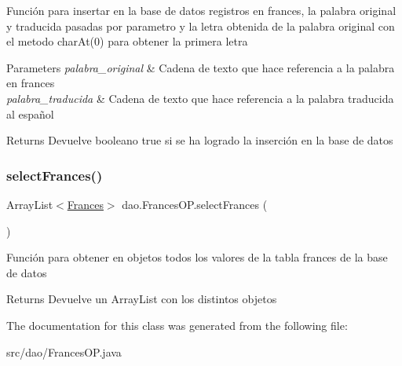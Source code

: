 Función para insertar en la base de datos registros en frances, la palabra original y traducida pasadas por parametro y la letra obtenida de la palabra original con el metodo char\+At(0) para obtener la primera letra 
\begin{DoxyParams}{Parameters}
{\em palabra\+\_\+original} & Cadena de texto que hace referencia a la palabra en frances \\
\hline
{\em palabra\+\_\+traducida} & Cadena de texto que hace referencia a la palabra traducida al español \\
\hline
\end{DoxyParams}
\begin{DoxyReturn}{Returns}
Devuelve booleano true si se ha logrado la inserción en la base de datos 
\end{DoxyReturn}
\mbox{\label{classdao_1_1_frances_o_p_a0a5b0c845f18105eaff2474c35d75720}} 
\subsubsection{\texorpdfstring{selectFrances()}{selectFrances()}}
{\footnotesize\ttfamily Array\+List$<$\mbox{\hyperlink{classvo_1_1_frances}{Frances}}$>$ dao.\+Frances\+O\+P.\+select\+Frances (\begin{DoxyParamCaption}{ }\end{DoxyParamCaption})\hspace{0.3cm}{\ttfamily [inline]}}

Función para obtener en objetos todos los valores de la tabla frances de la base de datos \begin{DoxyReturn}{Returns}
Devuelve un Array\+List con los distintos objetos 
\end{DoxyReturn}


The documentation for this class was generated from the following file\+:\begin{DoxyCompactItemize}
\item 
src/dao/Frances\+O\+P.\+java\end{DoxyCompactItemize}
